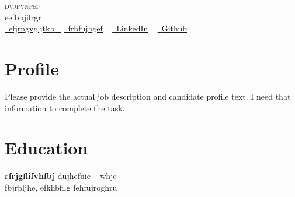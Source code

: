 \documentclass[letterpaper,11pt]{article}
\makeatletter
\newcommand{\resumeSubheading}[4]{
  \vspace{-2pt}\item
    \begin{tabular*}{1.0\textwidth}[t]{l@{\extracolsep{\fill}}r}
      \textbf{\large#1} & \textbf{\small #2} \\
      \textit{\large#3} & \textit{\small #4} \\
     
    \end{tabular*}\vspace{-7pt}
}
\newcommand{\resumeSubHeadingListStart}{\begin{itemize}[leftmargin=0.0in, label={}]}
\newcommand{\resumeSubHeadingListEnd}{\end{itemize}}
\makeatother
\begin{document}

\begin{center}
    {\Huge \scshape dvjfvnpej} \\ \vspace{1pt}
    eefbbjilrgr \\ \vspace{1pt}
    \small 
    \small \href{efjrngvgljtkb}{ \raisebox{-0.1\height}\faPhone\ \underline{efjrngvgljtkb} ~} 
    \href{frbfujbgef}{\raisebox{-0.2\height}\faEnvelope\  \underline{frbfujbgef}} ~
    \href{gvfvjbjvk}{\raisebox{-0.2\height}\faLinkedinSquare\ \underline{LinkedIn}}  ~
    \href{fhkjlrgvr}{\raisebox{-0.2\height}\faGithub\ \underline{Github}} ~
\end{center}
% 

\section{Profile}
Please provide the actual job description and candidate profile text.  I need that information to complete the task.\\ 



\section*{Education}
\textbf{rfrjgflifvhfbj} \hfill dujhefuie -- whjc \\[2pt]
fbjrbljhe, efkhbfilg \hfill fehfujroghru \\[6pt]




\end{document}
